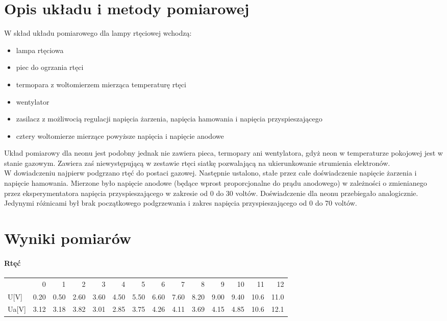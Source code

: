 \documentclass[a4paper,10pt]{article}
\begin{document}
\section{Opis układu i metody pomiarowej}
W skład układu pomiarowego dla lampy rtęciowej wchodzą:
\begin{itemize}
  \item lampa rtęciowa
  \item piec do ogrzania rtęci
  \item termopara z woltomierzem mierząca temperaturę rtęci
  \item wentylator
  \item zasilacz z możliwocią regulacji napięcia żarzenia, napięcia hamowania i napięcia przyspieszającego
  \item cztery woltomierze mierzące powyższe napięcia i napięcie anodowe
\end{itemize}
Układ pomiarowy dla neonu jest podobny jednak nie zawiera pieca, termopary ani wentylatora, gdyż neon w temperaturze pokojowej jest w stanie gazowym. Zawiera zaś niewystępującą w
zestawie rtęci siatkę pozwalającą na ukierunkowanie strumienia elektronów.\\
W dowiadczeniu najpierw podgrzano rtęć do postaci gazowej. Następnie ustalono, stałe przez całe doświadczenie napięcie żarzenia i napięcie hamowania. Mierzone było napięcie
anodowe (będące wprost proporcjonalne do prądu anodowego) w zależności o zmienianego przez eksperymentatora napięcia przyspieszającego w zakresie od 0 do 30 voltów. Doświadczenie
dla neonu przebiegało analogicznie. Jedynymi różnicami był brak początkowego podgrzewania i zakres napięcia przyspieszającego od 0 do 70 voltów.

\section{Wyniki pomiarów}
\paragraph{Rtęć}
\begin{tabular}{lrrrrrrrrrrrrr}
{} &    0  &    1  &    2  &    3  &    4  &    5  &    6  &    7  &    8  &    9  &    10 &    11 &    12 \\
U[V]  &  0.20 &  0.50 &  2.60 &  3.60 &  4.50 &  5.50 &  6.60 &  7.60 &  8.20 &  9.00 &  9.40 &  10.6 &  11.0 \\
Ua[V] &  3.12 &  3.18 &  3.82 &  3.01 &  2.85 &  3.75 &  4.26 &  4.11 &  3.69 &  4.15 &  4.85 &  10.6 &  12.1 \\
\end{tabular}
\end{document}
